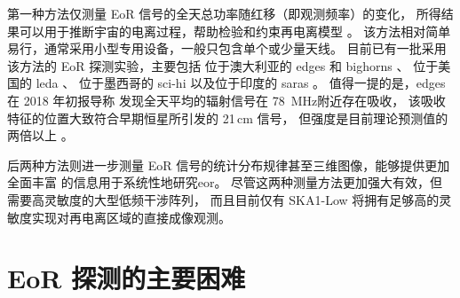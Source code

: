 第一种方法仅测量 EoR 信号的全天总功率随红移（即观测频率）的变化，
所得结果可以用于推断宇宙的电离过程，帮助检验和约束再电离模型
\cite{pritchard2012,liu2016}。
该方法相对简单易行，通常采用小型专用设备，一般只包含单个或少量天线。
目前已有一批采用该方法的 EoR 探测实验，主要包括
位于澳大利亚的 \ac{edges} \cite{bowman2008} 和
\ac{bighorns} \cite{sokolowski2015}、
位于美国的 \ac{leda} \cite{greenhill2012}、
位于墨西哥的 \ac{sci-hi} \cite{voytek2014}
以及位于印度的 \ac{saras} \cite{singh2018}。
值得一提的是，\acs{edges} 在 2018 年初报导称
发现全天平均的辐射信号在 \SI{78}{\MHz}附近存在吸收，
该吸收特征的位置大致符合早期恒星所引发的 21\,cm 信号，
但强度是目前理论预测值的两倍以上 \cite{bowman2018}。

后两种方法则进一步测量 EoR 信号的统计分布规律甚至三维图像，能够提供更加全面丰富
的信息用于系统性地研究\acl{eor}。
尽管这两种测量方法更加强大有效，但需要高灵敏度的大型低频干涉阵列，
而且目前仅有 SKA1-Low 将拥有足够高的灵敏度实现对再电离区域的直接成像观测。


\section{EoR 探测的主要困难}
\label{sec:det-difficulties}

